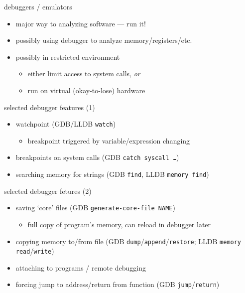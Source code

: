 \begin{frame}{debuggers / emulators}
    \begin{itemize}
    \item major way to analyzing software --- run it!
    \vspace{.5cm}
    \item possibly using debugger to analyze memory/registers/etc.
    \item possibly in restricted environment
        \begin{itemize}
        \item either limit access to system calls, \textit{or}
        \item run on virtual (okay-to-lose) hardware
        \end{itemize}
    \end{itemize}
\end{frame}

\begin{frame}{selected debugger features (1)}
    \begin{itemize}
    \item watchpoint (GDB/LLDB \texttt{watch})
        \begin{itemize}
        \item breakpoint triggered by variable/expression changing
        \end{itemize}
    \item breakpoints on system calls (GDB \texttt{catch syscall \ldots})
    \item searching memory for strings (GDB \texttt{find}, LLDB \texttt{memory find})
    \end{itemize}
\end{frame}

\begin{frame}{selected debugger fetures (2)}
    \begin{itemize}
    \item saving `core' files (GDB \texttt{generate-core-file NAME})
        \begin{itemize}
        \item full copy of program's memory, can reload in debugger later
        \end{itemize}
    \item copying memory to/from file (GDB \texttt{dump}/\texttt{append}/\texttt{restore}; LLDB \texttt{memory read}/\texttt{write})
    \item attaching to programs / remote debugging
    \item forcing jump to address/return from function (GDB \texttt{jump}/\texttt{return})
    \end{itemize}
\end{frame}

